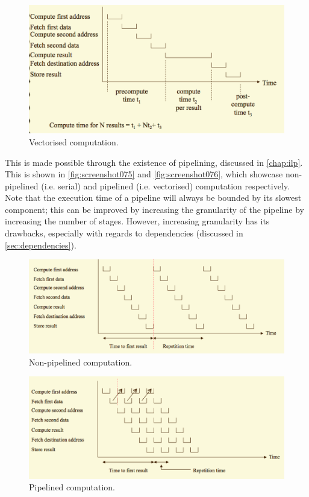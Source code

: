 \begin{figure}
\centering
\includegraphics[width=0.7\linewidth]{figures/screenshot074}
\caption{Vectorised computation.}
\label{fig:screenshot074}
\end{figure}

This is made possible through the existence of pipelining, discussed in \autoref{chap:ilp}. This is shown in \autoref{fig:screenshot075} and \autoref{fig:screenshot076}, which showcase non-pipelined (i.e. serial) and pipelined (i.e. vectorised) computation respectively. Note that the execution time of a pipeline will always be bounded by its slowest component; this can be improved by increasing the granularity of the pipeline by increasing the number of stages. However, increasing granularity has its drawbacks, especially with regards to dependencies (discussed in \autoref{sec:dependencies}).

\begin{figure}
\centering
\includegraphics[width=0.7\linewidth]{figures/screenshot075}
\caption{Non-pipelined computation.}
\label{fig:screenshot075}
\end{figure}

\begin{figure}
\centering
\includegraphics[width=0.7\linewidth]{figures/screenshot076}
\caption{Pipelined computation.}
\label{fig:screenshot076}
\end{figure}

